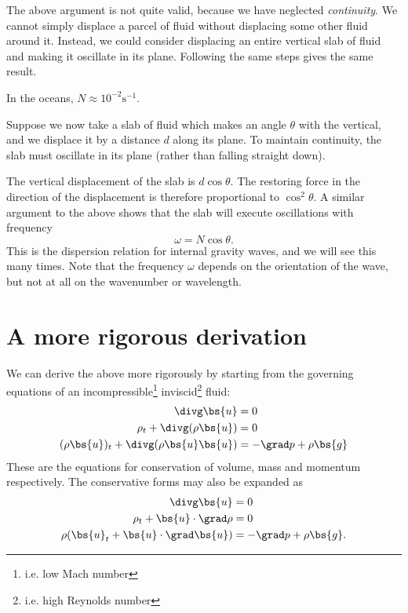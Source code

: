 The above argument is not quite valid, because we have neglected
\textit{continuity}. We cannot simply displace a parcel of fluid without
displacing some other fluid around it. Instead, we could consider displacing an
entire vertical slab of fluid and making it oscillate in its plane. Following
the same steps gives the same result. 

In the oceans, $N \approx 10^{-2}\mathrm{s^{-1}}$.

Suppose we now take a slab of fluid which makes an angle $\theta$ with the
vertical, and we displace it by a distance $d$ along its plane. To maintain
continuity, the slab must oscillate in its plane (rather than falling straight
down).

The vertical displacement of the slab is $d\cos\theta$. The restoring force in
the direction of the displacement is therefore proportional to $\cos^2\theta$. A
similar argument to the above shows that the slab will execute oscillations with
frequency
\begin{equation}
	\omega = N\cos\theta.
	\label{igwdisprel-theta}
\end{equation}
This is the dispersion relation for internal gravity waves, and we will see this
many times. Note that the frequency $\omega$ depends on the orientation of the
wave, but not at all on the wavenumber or wavelength. 

\section{A more rigorous derivation}

We can derive the above more rigorously by starting from the governing equations
of an incompressible\footnote{i.e. low Mach number} inviscid\footnote{i.e. high
Reynolds number} fluid:
\begin{align}
	\divg\bs{u} &= 0\\
	\rho_t + \divg(\rho\bs{u}) &= 0\\
	(\rho\bs{u})_t +\divg(\rho\bs{u}\bs{u}) &= -\grad p + \rho\bs{g} 
\end{align}
These are the equations for conservation of volume, mass and momentum
respectively. The conservative forms may also be expanded as 
\begin{align}
	\divg\bs{u} &= 0\\
	\rho_t + \bs{u}\cdot\grad\rho &= 0\\
	\rho (\bs{u}_t +\bs{u}\cdot\grad\bs{u}) &= -\grad p + \rho\bs{g}.
\end{align}

